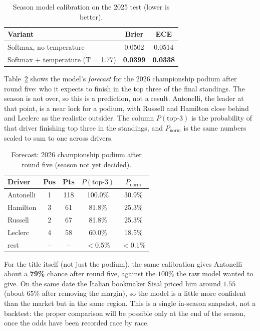 \documentclass[10pt,twocolumn]{article}
\begin{document}
\begin{table}[t]
\centering
\caption{Season model calibration on the 2025 test (lower is better).}
\label{tab:cal}
\begin{tabular}{lcc}
\toprule
Variant & Brier & ECE \\
\midrule
Softmax, no temperature  & 0.0502 & 0.0514 \\
Softmax + temperature (T = 1.77) & \textbf{0.0399} & \textbf{0.0338} \\
\bottomrule
\end{tabular}
\end{table}

Table~\ref{tab:champ} shows the model's \emph{forecast} for the 2026 championship
podium after round five: who it expects to finish in the top three of the final
standings. The season is not over, so this is a prediction, not a result.
Antonelli, the leader at that point, is a near lock for a podium, with Russell
and Hamilton close behind and Leclerc as the realistic outsider. The column
$P(\text{top-3})$ is the probability of that driver finishing top three in the
standings, and $P_{\text{norm}}$ is the same numbers scaled to sum to one across
drivers.

\begin{table}[t]
\centering
\caption{Forecast: 2026 championship podium after round five (season not yet
decided).}
\label{tab:champ}
\begin{tabular}{lcccc}
\toprule
Driver & Pos & Pts & $P(\text{top-3})$ & $P_{\text{norm}}$ \\
\midrule
Antonelli & 1 & 118 & 100.0\% & 30.9\% \\
Hamilton  & 3 & 61  & 81.8\%  & 25.3\% \\
Russell   & 2 & 67  & 81.8\%  & 25.3\% \\
Leclerc   & 4 & 58  & 60.0\%  & 18.5\% \\
rest      & --& --  & \(<\)0.5\% & \(<\)0.1\% \\
\bottomrule
\end{tabular}
\end{table}

For the title itself (not just the podium), the same calibration gives Antonelli
about a \textbf{79\%} chance after round five, against the \(100\%\) the raw
model wanted to give. On the same date the Italian bookmaker Sisal priced him
around \(1.55\) (about \(65\%\) after removing the margin), so the model is a
little more confident than the market but in the same region. This is a single
in-season snapshot, not a backtest: the proper comparison will be possible only
at the end of the season, once the odds have been recorded race by race.
\end{document}
